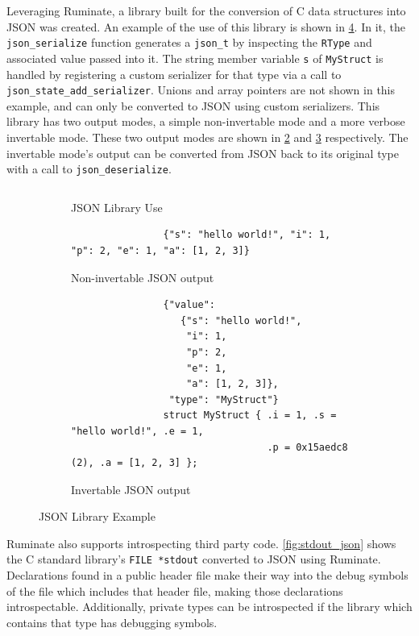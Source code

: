 \documentclass{report}
\begin{document}
Leveraging Ruminate, a library built for the conversion of C data structures
into JSON \autocite{json} was created. An example of the use of this library is
shown in \cref{fig:ruminate_jansson}. In it, the \lstinline|json_serialize|
function generates a \lstinline|json_t| by inspecting the \lstinline|RType| and
associated value passed into it. The string member variable \lstinline|s| of
\lstinline|MyStruct| is handled by registering a custom serializer for that type
via a call to \lstinline|json_state_add_serializer|. Unions and array pointers
are not shown in this example, and can only be converted to JSON using custom
serializers.  This library has two output modes, a simple non-invertable mode and a
more verbose invertable mode. These two output modes are shown in
\cref{fig:ruminate_jansson_non_invertable} and \cref{fig:ruminate_jansson_invertable}
respectively. The invertable mode's output can be converted from JSON back to
its original type with a call to \lstinline|json_deserialize|.

\begin{figure}
	\begin{subfigure}{\linewidth}
		{
			\footnotesize
			\inputminted[tabsize=2]{c}{ruminate-jansson-test.c}
		}
		\caption{JSON Library Use}
		\label{fig:ruminate_jansson_code}
	\end{subfigure}
	\begin{subfigure}{\linewidth}
		{
			\footnotesize
			\begin{verbatim}
				{"s": "hello world!", "i": 1, "p": 2, "e": 1, "a": [1, 2, 3]}
			\end{verbatim}
		}
		\caption{Non-invertable JSON output}
		\label{fig:ruminate_jansson_non_invertable}
	\end{subfigure}
	\begin{subfigure}{\linewidth}
		{
			\footnotesize
			\begin{verbatim}
				{"value":
				   {"s": "hello world!",
				    "i": 1,
				    "p": 2,
				    "e": 1,
				    "a": [1, 2, 3]},
				 "type": "MyStruct"}
				struct MyStruct { .i = 1, .s = "hello world!", .e = 1,
				                  .p = 0x15aedc8 (2), .a = [1, 2, 3] };
			\end{verbatim}
		}
		\caption{Invertable JSON output}
		\label{fig:ruminate_jansson_invertable}
	\end{subfigure}
	\caption{JSON Library Example}
	\label{fig:ruminate_jansson}
\end{figure}

Ruminate also supports introspecting third party code. \cref{fig:stdout_json}
shows the C standard library's \lstinline|FILE *stdout| converted to JSON using
Ruminate. Declarations found in a public header file make their way into the
debug symbols of the file which includes that header file, making those
declarations introspectable. Additionally, private types can be introspected if
the library which contains that type has debugging symbols.
\end{document}

